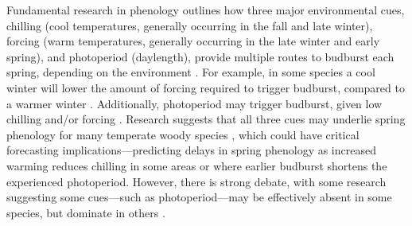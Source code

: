 \documentclass{article}
\begin{document}





\par Fundamental research in phenology outlines how three major environmental cues, chilling (cool temperatures, generally occurring in the fall and late winter), forcing (warm temperatures, generally occurring in the late winter and early spring), and photoperiod (daylength), provide multiple routes to budburst each spring, depending on the environment \citep{chuine2016}. For example, in some species a cool winter will lower the amount of forcing required to trigger budburst, compared to a warmer winter \citep{harrington2015}. Additionally, photoperiod may trigger budburst, given low chilling and/or forcing \citep{Basler:2014aa, Caffarra:2011b, zohner2016}. Research suggests that all three cues may underlie spring phenology for many temperate woody species \citep{flynn2018,Basler:2014aa,Caffarra:2011qf}, which could have critical forecasting implications---predicting delays in spring phenology as increased warming reduces chilling in some areas \citep{fraga2019} or where earlier budburst shortens the experienced photoperiod. However, there is strong debate, with some research suggesting some cues---such as photoperiod---may be effectively absent in some species, but dominate in others \citep{zohner2016,koerner2010a}. 
\end{document}
